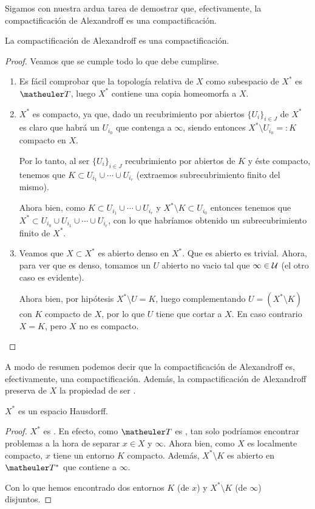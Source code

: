 Sigamos con nuestra ardua tarea de demostrar que, efectivamente, la compactificación de Alexandroff es una compactificación.

\begin{prop}[Consistencia]
	La compactificación de Alexandroff es una compactificación.
\end{prop}
\begin{proof}
	Veamos que se cumple todo lo que debe cumplirse.
	\begin{enumerate}
		\item Es fácil comprobar que la topología relativa de $X$ como subespacio de $X^*$ es $\T$, luego $X^*$ contiene una copia homeomorfa a $X$.
		\item $X^*$ es compacto, ya que, dado un recubrimiento por abiertos $\{U_i\}_{i\in J}$ de $X^*$ es claro que habrá un $U_{i_0}$ que contenga a $\infty$, siendo entonces $X^*\setminus U_{i_0}=:K$ compacto en $X$.
		
		Por lo tanto, al ser $\{U_i\}_{i\in J}$ recubrimiento por abiertos de $K$ y éste compacto, tenemos que $K\subset U_{i_1}\cup\cdots\cup U_{i_r}$ (extraemos subrecubrimiento finito del mismo).
		
		Ahora bien, como $K\subset U_{i_1}\cup\cdots\cup U_{i_r}$ y $X^*\setminus K\subset U_{i_0}$ entonces tenemos que $X^*\subset U_{i_0}\cup  U_{i_1}\cup\cdots\cup U_{i_r}$, con lo que habríamos obtenido un subrecubrimiento finito de $X^*$.
		\item Veamos que $X\subset X^*$ es abierto denso en $X^*$. Que es abierto es trivial. Ahora, para ver que es denso, tomamos un $U$ abierto no vacio tal que $\infty\in\mathcal{U}$ (el otro caso es evidente).
		
		Ahora bien, por hipótesis $X^*\setminus U = K$, luego complementando $U=(X^*\setminus K)$ con $K$ compacto de $X$, por lo que $U$ tiene que cortar a $X$. En caso contrario $X=K$, pero $X$ no es compacto.\qedhere
	\end{enumerate}
\end{proof}
A modo de resumen podemos decir que la compactificación de Alexandroff es, efectivamente, una compactificación. Además, la compactificación de Alexandroff preserva de $X$ la propiedad de ser \hausdorff.
\begin{lem}
	$X^*$ es un espacio Hausdorff.
\end{lem}
\begin{proof}
	 $X^*$ es \hausdorff. En efecto, como $\T$ es \hausdorff, tan solo podríamos encontrar problemas a la hora de separar $x\in X$ y $\infty$. Ahora bien, como $X$ es localmente compacto, $x$ tiene un entorno $K$ compacto. Además, $X^*\setminus K$ es abierto en $\T^*$ que contiene a $\infty$.
	 
	 Con lo que hemos encontrado dos entornos $K$ (de $x$) y $X^*\setminus K$ (de $\infty$) disjuntos.
\end{proof}
